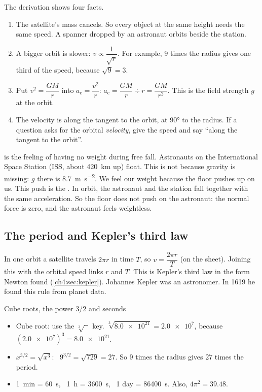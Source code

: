 The derivation shows four facts.
\begin{enumerate}
  \item The satellite's mass cancels. So every object at the same height needs the same speed.
        A spanner dropped by an astronaut orbits beside the station.
  \item A bigger orbit is slower: $v \propto \dfrac{1}{\sqrt r}$. For example, 9 times the radius
        gives one third of the speed, because $\sqrt 9 = 3$.
  \item Put $v^2 = \dfrac{GM}{r}$ into $a_\mathrm{c} = \dfrac{v^2}{r}$:
        $a_\mathrm{c} = \dfrac{GM}{r} \div r = \dfrac{GM}{r^2}$. This is the field strength $g$ at
        the orbit.
  \item The velocity is along the tangent to the orbit, at \ang{90} to the radius. If a question
        asks for the orbital \emph{velocity}, give the speed and say ``along the tangent to the
        orbit''.
\end{enumerate}

 is the feeling of having no weight during free fall. Astronauts on
the International Space Station (ISS, about \qty{420}{km} up) float. This is not because gravity is
missing: $g$ there is \qty{8.7}{m.s^{-2}}. We feel our weight because the floor pushes up on us.
This push is the . In orbit, the astronaut and the station fall together with
the same acceleration. So the floor does not push on the astronaut: the normal force is zero, and
the astronaut feels weightless.

\subsection{The period and Kepler's third law}
In one orbit a satellite travels $2\pi r$ in time $T$, so $v = \dfrac{2\pi r}{T}$ (on the
sheet). Joining this with the orbital speed links $r$ and $T$. This is Kepler's third law in the
form Newton found (\cref{ch4:sec:kepler}). Johannes Kepler was an astronomer. In 1619 he found
this rule from planet data.

\begin{toolkit}{Cube roots, the power 3/2 and seconds}
\begin{itemize}
  \item Cube root: use the $\sqrt[3]{\phantom{x}}$ key. $\sqrt[3]{\num{8.0e21}} = \num{2.0e7}$,
        because $(\num{2.0e7})^3 = \num{8.0e21}$.
  \item $x^{3/2} = \sqrt{x^3}$: \ $9^{3/2} = \sqrt{729} = 27$. So 9 times the radius gives 27 times
        the period.
  \item \qty{1}{min} = \qty{60}{s}, \ \qty{1}{h} = \qty{3600}{s}, \ 1 day = \qty{86400}{s}.
        Also, $4\pi^2 = 39.48$.
\end{itemize}
\end{toolkit}

